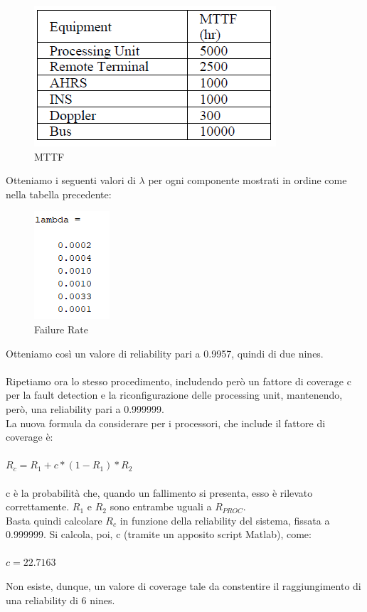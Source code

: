 		\begin{figure}[H]
			\centering
			\includegraphics[scale=0.7]{./immagine/mttf_es5.png}
			\caption{MTTF}
			\label{fig:mttf_es5}
		\end{figure}
		
	Otteniamo i seguenti valori di $\lambda$ per ogni componente mostrati in ordine come nella tabella precedente:
	
	\begin{figure}[H]
		\centering
		\includegraphics[scale=0.9]{./immagine/lambda_es5.png}
		\caption{Failure Rate}
		\label{fig:lambda_es5}
	\end{figure}
	
	Otteniamo così un valore di reliability pari a 0.9957, quindi di due nines.\\\\
	Ripetiamo ora lo stesso procedimento, includendo però un fattore di coverage c per la fault detection e la riconfigurazione delle processing unit, mantenendo, però, una reliability pari a 0.999999.\\
	La nuova formula da considerare per i processori, che include il fattore di coverage è:\\\\
	$ R_{c}=R_{1}+c*(1-R_{1})*R_{2} $\\\\
	c è la probabilità che, quando un fallimento si presenta, esso è rilevato correttamente. $R_{1}$ e $R_{2}$ sono entrambe uguali a $R_{PROC}$.\\
	Basta quindi calcolare $R_{c}$ in funzione della reliability del sistema, fissata a 0.999999. Si calcola, poi, c (tramite un apposito script Matlab), come:\\\\
	$ c=22.7163$
	
	Non esiste, dunque, un valore di coverage tale da constentire il raggiungimento di una reliability di 6 nines.